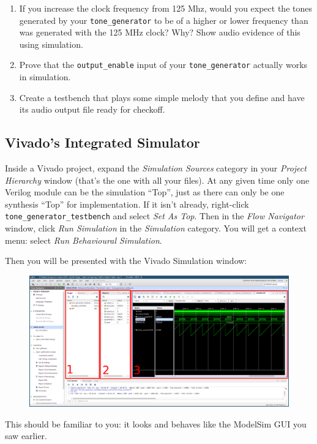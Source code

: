 \documentclass[11pt]{article}
\begin{document}
\begin{enumerate}
	\item If you increase the clock frequency from 125 Mhz, would you expect the tones generated by your \verb|tone_generator| to be of a higher or lower frequency than was generated with the 125 MHz clock? Why? Show audio evidence of this using simulation.
	\item Prove that the \verb|output_enable| input of your \verb|tone_generator| actually works in simulation.
	\item Create a testbench that plays some simple melody that you define and have its audio output file ready for checkoff.
\end{enumerate}

\subsection{Vivado's Integrated Simulator}

Inside a Vivado project, expand the \emph{Simulation Sources} category in your \emph{Project Hierarchy} window (that's the one with all your files). At any given time only one Verilog module can be the simulation ``Top'', just as there can only be one synthesis ``Top'' for implementation. If it isn't already, right-click \verb|tone_generator_testbench| and select \emph{Set As Top}. Then in the \emph{Flow Navigator} window, click \emph{Run Simulation} in the \emph{Simulation} category. You will get a context menu: select \emph{Run Behavioural Simulation}.

Then you will be presented with the Vivado Simulation window:

\begin{figure}[H]
	\centerline{\includegraphics[width=\textwidth]{figs/vivado_xsim.png}}
\end{figure}

This should be familiar to you: it looks and behaves like the ModelSim GUI you saw earlier.
\end{document}
